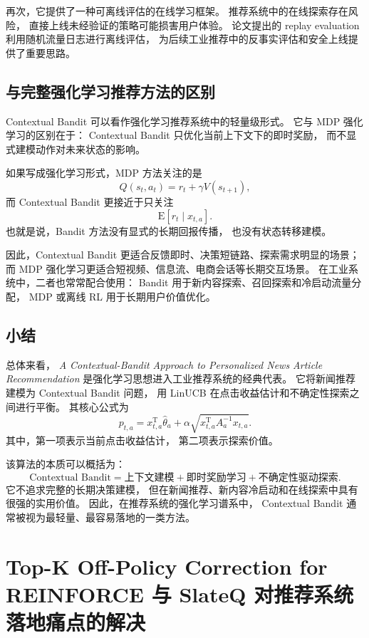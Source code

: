 \documentclass[11pt]{ctexart}
\begin{document}
再次，它提供了一种可离线评估的在线学习框架。
推荐系统中的在线探索存在风险，
直接上线未经验证的策略可能损害用户体验。
论文提出的 replay evaluation 利用随机流量日志进行离线评估，
为后续工业推荐中的反事实评估和安全上线提供了重要思路。

\subsection{与完整强化学习推荐方法的区别}

Contextual Bandit 可以看作强化学习推荐系统中的轻量级形式。
它与 MDP 强化学习的区别在于：
Contextual Bandit 只优化当前上下文下的即时奖励，
而不显式建模动作对未来状态的影响。

如果写成强化学习形式，MDP 方法关注的是
\[
Q(s_t,a_t)
=
r_t+\gamma V(s_{t+1}),
\]
而 Contextual Bandit 更接近于只关注
\[
\mathrm{E}[r_t\mid x_{t,a}].
\]
也就是说，Bandit 方法没有显式的长期回报传播，
也没有状态转移建模。

因此，Contextual Bandit 更适合反馈即时、决策短链路、探索需求明显的场景；
而 MDP 强化学习更适合短视频、信息流、电商会话等长期交互场景。
在工业系统中，二者也常常配合使用：
Bandit 用于新内容探索、召回探索和冷启动流量分配，
MDP 或离线 RL 用于长期用户价值优化。

\subsection{小结}

总体来看，
\textit{A Contextual-Bandit Approach to Personalized News Article Recommendation}
是强化学习思想进入工业推荐系统的经典代表。
它将新闻推荐建模为 Contextual Bandit 问题，
用 LinUCB 在点击收益估计和不确定性探索之间进行平衡。
其核心公式为
\[
p_{t,a}
=
x_{t,a}^{\mathrm{T}}\hat{\theta}_a
+
\alpha
\sqrt{
x_{t,a}^{\mathrm{T}}A_a^{-1}x_{t,a}
}.
\]
其中，第一项表示当前点击收益估计，
第二项表示探索价值。

该算法的本质可以概括为：
\[
\text{Contextual Bandit}
=
\text{上下文建模}
+
\text{即时奖励学习}
+
\text{不确定性驱动探索}.
\]
它不追求完整的长期决策建模，
但在新闻推荐、新内容冷启动和在线探索中具有很强的实用价值。
因此，在推荐系统的强化学习谱系中，
Contextual Bandit 通常被视为最轻量、最容易落地的一类方法。



\section{Top-K Off-Policy Correction for REINFORCE 与 SlateQ 对推荐系统落地痛点的解决}
\end{document}

